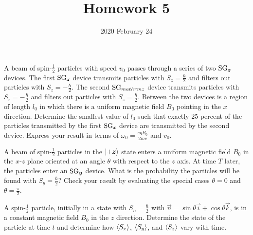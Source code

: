 \documentclass{../phys116}
\title{Homework 5}
\author{}
\date{2020 February 24}
\begin{document}
\begin{exercise}
  A beam of spin-\(\frac 1 2\) particles with speed \(v_0\) passes
  through a series of two \(\SG_{\vec z}\) devices.  The first
  \(\SG_{\vec z}\) device transmits particles with
  \(S_z = \frac \hbar 2\) and filters out particles with
  \(S_z = -\frac \hbar 2\).  The second \(\mathrm{SG}_{mathrm z}\) device
  transmits particles with \(S_z = -\frac \hbar 2\) and filters out
  particles with \(S_z = \frac \hbar 2\).  Between the two devices is
  a region of length \(l_0\) in which there is a uniform magnetic
  field \(B_0\) pointing in the \(x\) direction.  Determine the
  smallest value of \(l_0\) such that exactly \(25\) percent of the
  particles transmitted by the first \(\SG_{\vec z}\) device are
  transmitted by the second device.  Express your result in terms of
  \(\omega_0 = \frac{egB_0}{2mc}\) and \(v_0\).
\end{exercise}

\begin{solution}

\end{solution}

\begin{exercise}
  A beam of spin-\(\frac 1 2\) particles in the \(\ket{+\vec z}\)
  state enters a uniform magnetic field \(B_0\) in the \(x\)-\(z\)
  plane oriented at an angle \(\theta\) with respect to the \(z\)
  axis.  At time \(T\) later, the particles enter an \(\SG_{\vec y}\)
  device.  What is the probability the particles will be found with
  \(S_y = \frac \hbar 2\)?  Check your result by evaluating the
  special cases \(\theta = 0\) and \(\theta = \frac \pi 2\).
\end{exercise}

\begin{solution}

\end{solution}

\begin{exercise}
  A spin-\(\frac 1 2\) particle, initially in a state with
  \(S_n = \frac \hbar 2\) with
  \(\vec n = \sin \theta \vec i + \cos \theta \vec k\), is in a
  constant magnetic field \(B_0\) in the \(z\) direction.  Determine
  the state of the particle at time \(t\) and determine how
  \(\langle S_x\rangle\), \(\langle S_y\rangle\), and \(\langle S_z\rangle\) vary with time.
\end{exercise}

\begin{solution}

\end{solution}
\end{document}
